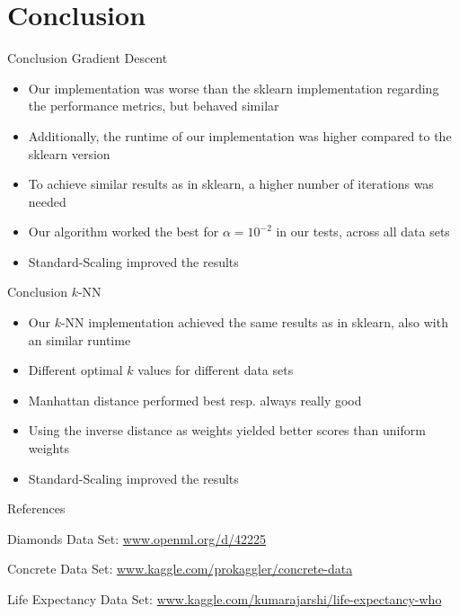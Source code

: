 \documentclass[10pt]{beamer}
\begin{document}
\section[Conclusion]{Conclusion}
    \begin{frame}[fragile]{Conclusion Gradient Descent}
        \begin{itemize}
            \item Our implementation was worse than the sklearn implementation regarding the performance metrics, but behaved similar 
            
            \item Additionally, the runtime of our implementation was higher compared to the sklearn version
            
            \item To achieve similar results as in sklearn, a higher number of iterations was needed

            \item Our algorithm worked the best for $\alpha=10^{-2}$ in our tests, across all data sets
            
            \item Standard-Scaling improved the results
        \end{itemize}
    \end{frame}
    
    \begin{frame}[fragile]{Conclusion $k$-NN}
        \begin{itemize}
            \item Our $k$-NN implementation achieved the same results as in sklearn, also with an similar runtime
            
            \item Different optimal $k$ values for different data sets
            
            \item Manhattan distance performed best resp. always really good
            
            \item Using the inverse distance as weights yielded better scores than uniform weights
            
            \item Standard-Scaling improved the results
        \end{itemize}
    \end{frame}
    
\begin{frame}[allowframebreaks]{References}
    
    
    
        Diamonds Data Set: \url{www.openml.org/d/42225}
        
        Concrete Data Set: \url{www.kaggle.com/prokaggler/concrete-data}
    
        Life Expectancy Data Set: \url{www.kaggle.com/kumarajarshi/life-expectancy-who}
\end{frame}
\end{document}
